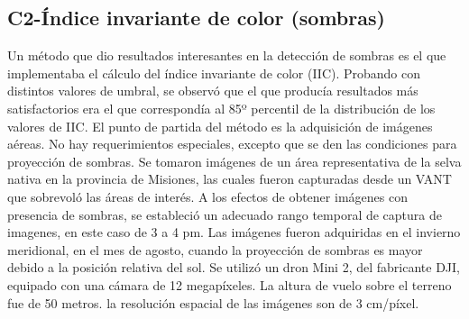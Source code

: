 \subsection{C2-Índice invariante de color (sombras)}
Un método que dio resultados interesantes en la detección de sombras es el que implementaba el cálculo del índice invariante de color (IIC). Probando con distintos valores de umbral, se observó que el que producía resultados más satisfactorios era el que correspondía al 85º percentil de la distribución de los valores de IIC.
El punto de partida del método es la adquisición de imágenes aéreas. No hay requerimientos especiales, excepto que se den las condiciones para proyección de sombras. Se tomaron imágenes de un área representativa de la selva nativa en la provincia de Misiones, las cuales fueron capturadas desde un VANT que sobrevoló las áreas de interés. A los efectos de obtener imágenes con presencia de sombras, se estableció un adecuado rango temporal de captura de imagenes, en este caso de 3 a 4 pm. Las imágenes fueron adquiridas en el invierno meridional, en el mes de agosto, cuando la proyección de sombras es mayor debido a la posición relativa del sol. Se utilizó un dron Mini 2, del fabricante DJI, equipado con una cámara de 12 megapíxeles. La altura de vuelo sobre el terreno fue de 50 metros. la resolución espacial de las imágenes son de 3 cm/píxel.
